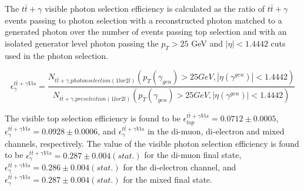 The $t\bar{t}+\gamma$ visible photon selection efficiency is calculated as the ratio of $t\bar{t}+\gamma$ events passing to photon selection with a reconstructed photon matched to a generated photon over the number of events passing top selection and with an isolated generator level photon passing the $p_T > 25$ GeV and $| \eta | < 1.4442$ cuts used in the photon selection.

\begin{equation}
	\epsilon^{t\bar{t}+\gamma Vis}_{\gamma} = \frac{N_{t\bar{t}+\gamma.photonselection(1lor2l)}\left( p_T(\gamma_{gen}) > 25 GeV, |\eta(\gamma^{gen})| < 1.4442 \right)}{N_{t\bar{t}+\gamma.preselection(1lor2l)}\left( p_T(\gamma_{gen}) > 25 GeV, |\eta(\gamma^{gen})| < 1.4442 \right)} 
\end{equation}

The visible top selection efficiency is found to be $\epsilon^{t\bar{t}+\gamma Vis}_{top} = 0.0712 \pm 0.0005$, $\epsilon^{t\bar{t}+\gamma Vis}_{\gamma} = 0.0928 \pm 0.0006$, and $\epsilon^{t\bar{t}+\gamma Vis}_{\gamma}$ in the di-muon, di-electron and mixed channels, respectively. The value of the visible photon selection efficiency is found to be $\epsilon^{t\bar{t}+\gamma Vis}_{\gamma} = 0.287 \pm 0.004 ( stat.)$ for the di-muon final state, $\epsilon^{t\bar{t}+\gamma Vis}_{\gamma} = 0.286 ± 0.004 (stat.)$ for the di-electron channel, and $\epsilon^{t\bar{t}+\gamma Vis}_{\gamma} = 0.287 \pm 0.004 ( stat.)$ for the mixed final state.